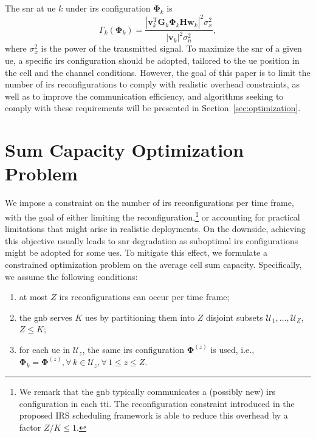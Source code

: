 The \gls{snr} at \gls{ue} $k$ under \gls{irs} configuration $\bm{\Phi}_k$ is
\begin{equation}\label{snr_k}
    \Gamma_k(\bm{\Phi}_k) = \frac{|\bm{v}_k^{\mathrm T} \bm{G}_k \bm{\Phi}_k \bm{H}  \bm{w}_k |^2\sigma_{x}^2}{|\bm{v}_k|^2\sigma_{n}^2},
\end{equation}
where $\sigma_{x}^2$ is the power of the transmitted signal.
To maximize the \gls{snr} of a given \gls{ue}, a specific \gls{irs} configuration should be adopted, tailored to the \gls{ue} position in the cell and the channel conditions.
However, the goal of this paper is to limit the number of \gls{irs} reconfigurations to comply with realistic overhead constraints, as well as to improve the communication efficiency, and algorithms seeking to comply with these requirements will be presented in Section~\ref{sec:optimization}.

\section{Sum Capacity Optimization Problem}\label{sec:sumcapoptimization}

We impose a constraint on the number of \gls{irs} reconfigurations per time frame, with the goal of either limiting the reconfiguration,\footnote{We remark that the \gls{gnb} typically communicates a (possibly new) \gls{irs} configuration in each \gls{tti}. The reconfiguration constraint introduced in the proposed IRS scheduling framework is able to reduce this overhead by a factor ${Z}/{K} \leq 1$.} or accounting for practical limitations that might arise in realistic deployments.
On the downside, achieving this objective usually leads to \gls{snr} degradation as suboptimal \gls{irs} configurations might be adopted for some \glspl{ue}. To mitigate this effect, we formulate a constrained optimization problem on the average cell sum capacity.
Specifically, we assume the following conditions:
\begin{enumerate}[label=\arabic*.]
    \item at most $Z$ \gls{irs} reconfigurations can occur per time frame;
    \item the \gls{gnb} serves $K$ \glspl{ue} by partitioning them into $Z$ disjoint subsets $\mathcal{U}_1,\ldots,\mathcal{U}_{Z}$, $Z\leq K$;
    \item for each \gls{ue} in $\mathcal{U}_z$, the same \gls{irs} configuration $\bm{\Phi}^{(z)}$ is used, i.e., $\bm{\Phi}_k = \bm{\Phi}^{(z)}, \forall \, k \in \mathcal{U}_z, \forall \, 1\leq z \leq Z$.
\end{enumerate}

